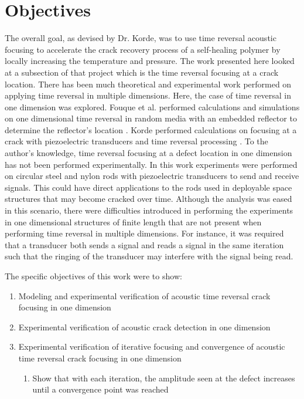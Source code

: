 \section{Objectives}
The overall goal, as devised by Dr. Korde, was to use time reversal acoustic focusing to accelerate the crack recovery process of a self-healing polymer by locally increasing the temperature and pressure. The work presented here looked at a subsection of that project which is the time reversal focusing at a crack location. There has been much theoretical and experimental work performed on applying time reversal in multiple dimensions. Here, the case of time reversal in one dimension was explored. Fouque et al. performed calculations and simulations on one dimensional time reversal in random media with an embedded reflector to determine the reflector's location \cite{Fouque2006}. Korde performed calculations on focusing at a crack with piezoelectric transducers and time reversal processing \cite{Fehrman2012}. To the author's knowledge, time reversal focusing at a defect location in one dimension has not been performed experimentally. In this work experiments were performed on circular steel and nylon rods with piezoelectric transducers to send and receive signals. This could have direct applications to the rods used in deployable space structures that may become cracked over time. Although the analysis was eased in this scenario, there were difficulties introduced in performing the experiments in one dimensional structures of finite length that are not present when performing time reversal in multiple dimensions. For instance, it was required that a transducer both sends a signal and reads a signal in the same iteration such that the ringing of the transducer may interfere with the signal being read.\newline

The specific objectives of this work were to show:
\begin{enumerate}
\item Modeling and experimental verification of acoustic time reversal crack focusing in one dimension
\item Experimental verification of acoustic crack detection in one dimension
\item Experimental verification of iterative focusing and convergence of acoustic time reversal crack focusing in one dimension
	\begin{enumerate} 
	\item Show that with each iteration, the amplitude seen at the defect increases until a convergence point was reached
	\end{enumerate}

\end{enumerate}
